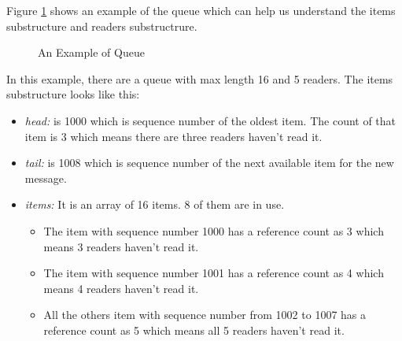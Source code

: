 Figure \ref{fig:queue:example} shows an example of the queue which can help us understand the items substructure and readers substructrure.
\begin{figure}[!htb]
\centering
{}
\caption{ An Example of Queue}
\label{fig:queue:example}
\end{figure}
In this example, there are a queue with max length 16 and 5 readers. The items substructure looks like this:
\begin{itemize}
	\item{\emph{head:} is 1000 which is sequence number of the oldest item. The count of that item is 3 which means there are three readers haven't read it. }
	  \item{\emph{tail:} is 1008 which is sequence number of the next available item for the new message. }
	  \item{\emph{items:} It is an array of 16 items. 8 of them are in use. }
	  \begin{itemize}
	  	\item{The item with sequence number 1000 has a reference count as 3 which means 3 readers haven't read it.}
		 \item{The item with sequence number 1001 has a reference count as 4 which means 4 readers haven't read it.}
		 \item{All the others item with sequence number from 1002 to 1007 has a reference count as 5 which means all 5 readers haven't read it.}
	\end{itemize}
\end{itemize} 

